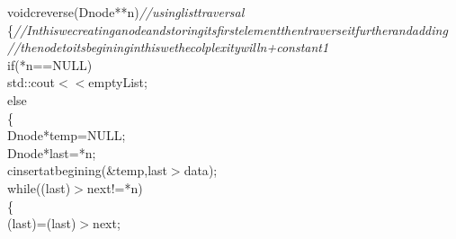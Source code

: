 \documentclass[a4paper, 9pt]{article}
\newcommand\SPC{\hspace*{0.6em}}
\newcommand\TAB{\hspace*{1.2em}}
\newcommand\HYP{\mbox{\char 45}}
\newcommand\QOT{\mbox{\char 34}}
\newcommand{\CppAComment}[1]{\textit{\textcolor[rgb]{0.4,0.45,0.48}{#1}}}
\newcommand{\CppAIdentifier}[1]{\textcolor[rgb]{0.88,0.89,0.89}{#1}}
\newcommand{\CppAReservedWord}[1]{\textcolor[rgb]{0.4,0.55,0.69}{#1}}
\newcommand{\CppASpace}[1]{\colorbox[rgb]{0.16,0.19,0.2}{#1}}
\newcommand{\CppAString}[1]{\textcolor[rgb]{0.93,0.46,0}{#1}}
\newcommand{\CppASymbol}[1]{\textcolor[rgb]{0.91,0.89,0.72}{#1}}
\begin{document}
\begin{ttfamily}
\CppASpace{\TAB }\CppAReservedWord{void}\CppASpace{\SPC \SPC }\CppAIdentifier{creverse}\CppASymbol{(}\CppAIdentifier{Dnode}\CppASymbol{*}\CppASymbol{*}\CppASpace{\SPC }\CppAIdentifier{n}\CppASymbol{)}\CppASpace{\SPC }\CppAComment{//using\SPC list\SPC traversal}\\
\CppASpace{\TAB }\CppASymbol{\{}\CppASpace{\SPC \SPC \SPC \SPC \TAB \TAB \TAB \TAB \SPC \SPC \SPC \SPC \SPC }\CppAComment{//In\SPC this\SPC we\SPC creating\SPC a\SPC node\SPC and\SPC storing\SPC its\SPC first\SPC element\SPC then\SPC traverse\SPC it\SPC further\SPC and\SPC adding}\\
\CppASpace{\TAB \TAB }\CppAComment{//the\SPC node\SPC to\SPC its\SPC begining\SPC in\SPC this\SPC we\SPC the\SPC colplexity\SPC will\SPC n+constant\SPC 1}\\
\CppASpace{\TAB \TAB }\CppAReservedWord{if}\CppASymbol{(}\CppASymbol{*}\CppAIdentifier{n}\CppASymbol{==}\CppAIdentifier{NULL}\CppASymbol{)}\\
\CppASpace{\TAB \TAB \SPC \SPC }\CppAIdentifier{std}\CppASymbol{::}\CppAIdentifier{cout}\CppASymbol{$<$$<$}\CppAString{\QOT empty\SPC List\QOT }\CppASymbol{;}\\
\CppASpace{\TAB \TAB }\CppAReservedWord{else}\\
\CppASpace{\TAB \TAB }\CppASymbol{\{}\CppASpace{\SPC \SPC \SPC }\\
\CppASpace{\TAB \TAB \SPC \SPC \SPC \SPC }\CppAIdentifier{Dnode}\CppASymbol{*}\CppASpace{\SPC }\CppAIdentifier{temp}\CppASymbol{=}\CppASpace{\SPC }\CppAIdentifier{NULL}\CppASymbol{;}\\
\CppASpace{\TAB \TAB \SPC \SPC \SPC \SPC }\CppAIdentifier{Dnode}\CppASymbol{*}\CppASpace{\SPC }\CppAIdentifier{last}\CppASymbol{=}\CppASymbol{*}\CppAIdentifier{n}\CppASymbol{;}\\
\CppASpace{\TAB \SPC \SPC \SPC \SPC \SPC \SPC \SPC \SPC }\CppAIdentifier{cinsertatbegining}\CppASymbol{(}\CppASymbol{\&}\CppAIdentifier{temp}\CppASymbol{,}\CppAIdentifier{last}\CppASymbol{\HYP $>$}\CppAIdentifier{data}\CppASymbol{)}\CppASymbol{;}\\
\CppASpace{\TAB \TAB \TAB }\CppAReservedWord{while}\CppASymbol{(}\CppASymbol{(}\CppAIdentifier{last}\CppASymbol{)}\CppASymbol{\HYP $>$}\CppAIdentifier{next}\CppASymbol{!=}\CppASymbol{*}\CppAIdentifier{n}\CppASymbol{)}\\
\CppASpace{\TAB \TAB \SPC \SPC \SPC \SPC }\CppASymbol{\{}\CppASpace{\SPC }\\
\CppASpace{\TAB \TAB \TAB \SPC \SPC }\CppASymbol{(}\CppAIdentifier{last}\CppASymbol{)}\CppASymbol{=}\CppASymbol{(}\CppAIdentifier{last}\CppASymbol{)}\CppASymbol{\HYP $>$}\CppAIdentifier{next}\CppASymbol{;}\\

\end{ttfamily}
\end{document}
